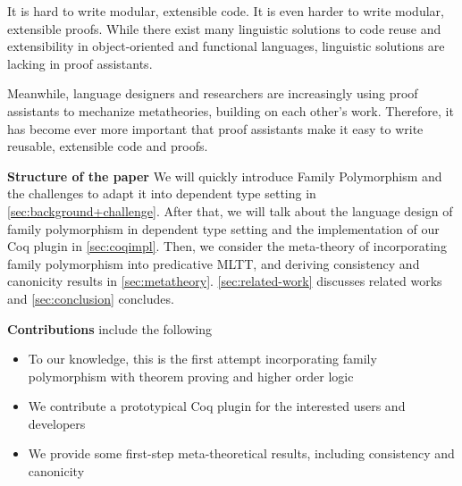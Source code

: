 It is hard to write modular, extensible code.
It is even harder to write modular, extensible proofs.
While there exist many linguistic solutions to code reuse and
extensibility in object-oriented and functional languages,
linguistic solutions are lacking in proof assistants.

Meanwhile, language designers and researchers are increasingly
using proof assistants to mechanize meta\-theories, building on each
other's work.
Therefore, it has become ever more important that proof assistants
make it easy to write reusable, extensible code and proofs.



\large{\textbf{Structure of the paper}} We will quickly introduce Family Polymorphism and the challenges to adapt it into dependent type setting in \cref{sec:background+challenge}. After that, we will talk about the language design of family polymorphism in dependent type setting and the implementation of our Coq plugin in \cref{sec:coqimpl}. Then, we consider the meta-theory of incorporating family polymorphism into predicative MLTT, and deriving consistency and canonicity results in \cref{sec:metatheory}. \ref{sec:related-work} discusses related works and \ref{sec:conclusion} concludes.


\large{\textbf{Contributions}} include the following
\begin{itemize}
  \item To our knowledge, this is the first attempt incorporating family polymorphism with theorem proving and higher order logic
  \item We contribute a prototypical Coq plugin for the interested users and developers 
  \item We provide some first-step meta-theoretical results, including consistency and canonicity
\end{itemize}
